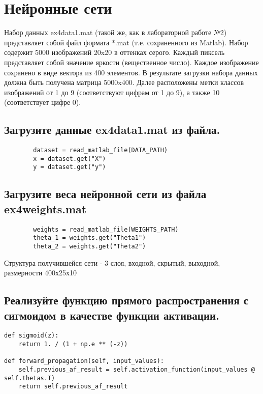 







\section{Нейронные сети}
\label{sec:purpose}

Набор данных ex4data1.mat (такой же, как в лабораторной работе №2) представляет собой файл формата *.mat (т.е. сохраненного из Matlab). Набор содержит 5000 изображений 20x20 в оттенках серого. Каждый пиксель представляет собой значение яркости (вещественное число). Каждое изображение сохранено в виде вектора из 400 элементов. В результате загрузки набора данных должна быть получена матрица 5000x400. Далее расположены метки классов изображений от 1 до 9 (соответствуют цифрам от 1 до 9), а также 10 (соответствует цифре 0).


\subsection{Загрузите данные ex4data1.mat из файла.}

\begin{lstlisting}
        dataset = read_matlab_file(DATA_PATH)
        x = dataset.get("X")
        y = dataset.get("y")
\end{lstlisting}

\subsection{Загрузите веса нейронной сети из файла ex4weights.mat}


\begin{lstlisting}
        weights = read_matlab_file(WEIGHTS_PATH)
        theta_1 = weights.get("Theta1")
        theta_2 = weights.get("Theta2")
\end{lstlisting}

Структура получившейся сети - 3 слоя, входной, скрытый, выходной, размерности 400х25х10

\subsection{Реализуйте функцию прямого распространения с сигмоидом в качестве функции активации.}

\begin{lstlisting}
def sigmoid(z):
    return 1. / (1 + np.e ** (-z))

def forward_propagation(self, input_values):
    self.previous_af_result = self.activation_function(input_values @ self.thetas.T)
    return self.previous_af_result
\end{lstlisting}

